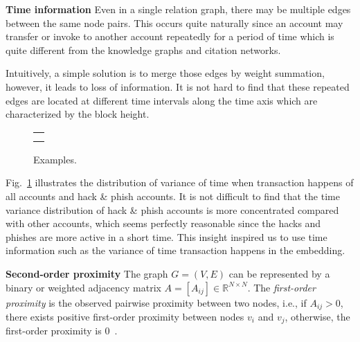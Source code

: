 \textbf{Time information} Even in a single relation graph, there may be multiple edges between the same node pairs. This occurs quite naturally since an account may transfer or invoke to another account repeatedly for a period of time which is quite different from the knowledge graphs and citation networks.

Intuitively, a simple solution is to merge those edges by weight summation, however, it leads to loss of information. It is not hard to find that these repeated edges are located at different time intervals along the time axis which are characterized by the block height.

\begin{figure}[htbp]
\centering
\begin{tabular}{c}
	\subfigure[Histogram of time std for all nodes.]{
		\label{fig:high_order}
    
	}\\
	\subfigure[Histogram of time std for hack\&phish nodes.]{
		\label{fig:asymmetric}
    
	}
\end{tabular}
\caption{Examples.}
\label{fig:time_std}
\end{figure}

Fig.~\ref{fig:time_std} illustrates the distribution of variance of time when transaction happens of all accounts and hack \& phish accounts. It is not difficult to find that the time variance distribution of hack \& phish accounts is more concentrated compared with other accounts, which seems perfectly reasonable since the hacks and phishes are more active in a short time. This insight inspired us to use time information such as the variance of time transaction happens in the embedding.

\textbf{Second-order proximity} The graph $G=(V,E)$ can be represented by a binary or weighted adjacency matrix $A=[A_{ij}]\in \mathbb{R}^{N\times N}$. The \emph{first-order proximity} is the observed pairwise proximity between two nodes, i.e., if $A_{ij}>0$, there exists positive first-order proximity between nodes $v_i$ and $v_j$, otherwise, the first-order proximity is $0$~\cite{tang2015line}.


